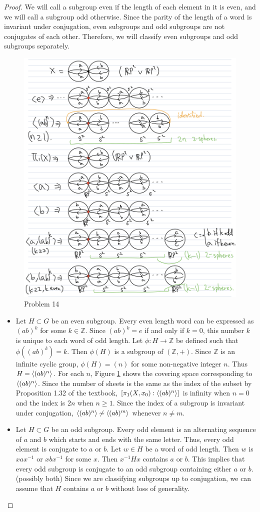 \documentclass[12pt, psamsfonts]{amsart}
\theoremstyle{definition}
\theoremstyle{remark}
\numberwithin{equation}{section}
\begin{document}
\begin{proof}
  We will call a subgroup even if the length of each element in it is even, and we will call a subgroup odd otherwise.
  Since the parity of the length of a word is invariant under conjugation, even subgroups and odd subgroups are not conjugates of each other.
  Therefore, we will classify even subgroups and odd subgroups separately.
  \begin{figure}
    \includegraphics[width=.7\linewidth]{problem14_classification.jpeg}
      \caption{Problem 14}
    \label{fig:problem14}
  \end{figure}

  \begin{itemize}
    \item
      Let $H \subset G$ be an even subgroup.
      Every even length word can be expressed as $(ab)^k$ for some $k \in \mathbb{Z}$.
      Since $(ab)^k = e$ if and only if $k = 0$, this number $k$ is unique to each word of odd length.
      Let $\phi: H \rightarrow \mathbb{Z}$ be defined such that $\phi((ab)^k) = k$.
      Then $\phi(H)$ is a subgroup of $(\mathbb{Z}, +)$.
      Since $\mathbb{Z}$ is an infinite cyclic group, $\phi(H) = (n)$ for some non-negative integer $n$.
      Thus $H = \ev{(ab)^n}$.
      For each $n$, Figure \ref{fig:problem14} shows the covering space corresponding to $\ev{(ab)^n}$.
      Since the number of sheets is the same as the index of the subset by Proposition 1.32 of the textbook, $[\pi_1(X, x_0):\ev{(ab)^n}]$ is infinity when $n = 0$ and the index is $2n$ when $n \geq 1$.
      Since the index of a subgroup is invariant under conjugation, $\ev{(ab)^n} \not\sim \ev{(ab)^m}$ whenever $n \ne m$.
    \item
      Let $H \subset G$ be an odd subgroup.
      Every odd element is an alternating sequence of $a$ and $b$ which starts and ends with the same letter.
      Thus, every odd element is conjugate to $a$ or $b$.
      Let $w \in H$ be a word of odd length.
      Then $w$ is $xax^{-1}$ or $xbx^{-1}$ for some $x$.
      Then $x^{-1}Hx$ contains $a$ or $b$.
      This implies that every odd subgroup is conjugate to an odd subgroup containing either $a$ or $b$. (possibly both)
      Since we are classifying subgroups up to conjugation, we can assume that $H$ contains $a$ or $b$ without loss of generality.


\end{itemize}
\end{proof}
\end{document}
